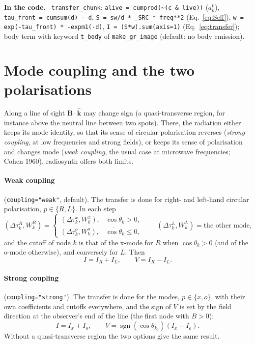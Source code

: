 \documentclass[11pt,a4paper]{article}
\newcommand{\code}[1]{\texttt{#1}}
\newcommand{\vect}[1]{\bm{#1}}
\newenvironment{incode}{\par\smallskip\noindent\begin{minipage}{\linewidth}\small\color{accent!80!black}\textbf{In the code.}~}{\end{minipage}\par\smallskip}
\begin{document}
\begin{incode}
\code{transfer\_chunk}: \code{alive = cumprod(\textasciitilde(c \& live))} ($a^p_k$),
\code{tau\_front = cumsum(d) - d}, \code{S = sw/d * \_SRC * freq**2} (Eq.~\ref{eq:Seff}),
\code{w = exp(-tau\_front) * -expm1(-d)}, \code{I = (S*w).sum(axis=1)}
(Eq.~\ref{eq:transfer}); body term with keyword \code{t\_body} of \code{make\_gr\_image}
(default: no body emission).
\end{incode}

\section{Mode coupling and the two polarisations}\label{sec:coupling}

Along a line of sight $\vect B\cdot\hat{\vect k}$ may change sign (a quasi-transverse region,
for instance above the neutral line between two spots). There, the radiation either keeps
its mode identity, so that its sense of circular polarisation reverses (\emph{strong
coupling}, at low frequencies and strong fields), or keeps its sense of polarisation and
changes mode (\emph{weak coupling}, the usual case at microwave frequencies; Cohen 1960).
\textsf{radiosynth} offers both limits.

\paragraph{Weak coupling} (\code{coupling="weak"}, default). The transfer is done for
right- and left-hand circular polarisation, $p\in\{R,L\}$. In each step
\begin{equation}
  (\Delta\tau^R_k,W^R_k)=\begin{cases}(\Delta\tau^x_k,W^x_k), & \overline{\cos\theta}_k>0,\\
                                       (\Delta\tau^o_k,W^o_k), & \overline{\cos\theta}_k\le0,\end{cases}
  \qquad
  (\Delta\tau^L_k,W^L_k)=\text{the other mode},
\end{equation}
and the cutoff of node $k$ is that of the x-mode for $R$ when $\cos\theta_k>0$ (and of the
o-mode otherwise), and conversely for $L$. Then
\begin{equation}
  I=I_R+I_L,\qquad V=I_R-I_L .
\end{equation}

\paragraph{Strong coupling} (\code{coupling="strong"}). The transfer is done for the modes,
$p\in\{x,o\}$, with their own coefficients and cutoffs everywhere, and the sign of $V$ is
set by the field direction at the observer's end of the line (the first node with $B>0$):
\begin{equation}
  I=I_x+I_o,\qquad V=\operatorname{sgn}\!\left(\cos\theta_{k_1}\right)\left(I_x-I_o\right).
\end{equation}
Without a quasi-transverse region the two options give the same result.
\end{document}

